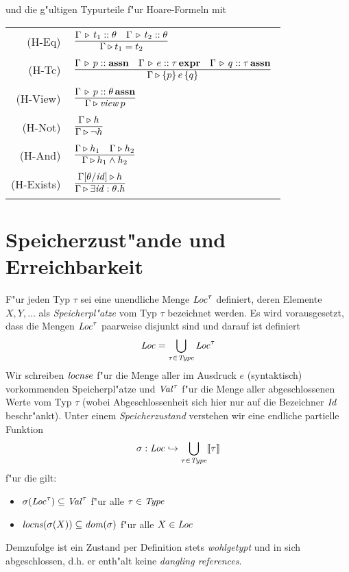 \documentclass[12pt,a4paper,bigheadings]{scrartcl}
\newcommand{\semantic}[1]{\ensuremath{\llbracket#1\rrbracket}}
\newcommand{\assn}{\ensuremath{\mathbf{assn}}}
\newcommand{\atype}[1]{#1\,\assn}
\newcommand{\bexpr}{\ensuremath{\mathbf{expr}}}
\newcommand{\etype}[1]{#1\,\bexpr}
\newcommand{\locns}{\name{locns}}
\newcommand{\view}[1]{\ensuremath{\app{\name{view}}{#1}}}
\newcommand{\RN}[1]{\mbox{{\sc (#1)}}}
\begin{document}
und die g"ultigen Typurteile f"ur Hoare-Formeln mit \\[3mm]
\begin{tabular}{rl}
  \RN{H-Eq} & $\regel{\Tj{\Gamma}{t_1}{\theta} \quad \Tj{\Gamma}{t_2}{\theta}}
                     {\Tjh{\Gamma}{t_1 = t_2}}$ \\[1mm]
  \RN{H-Tc} & $\regel{\Tj{\Gamma}{p}{\assn} \quad \Tj{\Gamma}{e}{\etype{\tau}} \quad \Tj{\Gamma}{q}{\atype{\tau}}}
                     {\Tjh{\Gamma}{\triple{p}{e}{q}}}$ \\[1mm]
  \RN{H-View} & $\regel{\Tj{\Gamma}{p}{\atype{\theta}}}
                       {\Tjh{\Gamma}{\view{p}}}$ \\[1mm]
  \RN{H-Not} & $\regel{\Tjh{\Gamma}{h}}
                      {\Tjh{\Gamma}{\neg h}}$ \\[1mm]
  \RN{H-And} & $\regel{\Tjh{\Gamma}{h_1} \quad \Tjh{\Gamma}{h_2}}
                      {\Tjh{\Gamma}{h_1 \wedge h_2}}$ \\[1mm]
  \RN{H-Exists} & $\regel{\Tjh{\Gamma[\theta/\id]}{h}}
                         {\Tjh{\Gamma}{\exists \id:\theta.h}}$
\end{tabular}


\section{Speicherzust"ande und Erreichbarkeit}

F"ur jeden Typ $\tau$ sei eine unendliche Menge ${\text{\it Loc\/}}^\tau$ definiert, deren Elemente $X,Y,\ldots$
als {\em Speicherpl"atze} vom Typ $\tau$ bezeichnet werden. Es wird vorausgesetzt, dass die Mengen
${\text{\it Loc\/}}^\tau$ paarweise disjunkt sind und darauf ist definiert
\[
  {\text{\it Loc\/}} = \bigcup_{\tau\in{\text{\it Type\/}}} {\text{\it Loc\/}}^\tau
\]
Wir schreiben $\locns{e}$ f"ur die Menge aller im Ausdruck $e$ (syntaktisch) vorkommenden Speicherpl"atze
und ${\text{\it Val\/}}^\tau$ f"ur die Menge aller abgeschlossenen Werte vom Typ $\tau$ (wobei Abgeschlossenheit sich
hier nur auf die Bezeichner ${\text{\it Id\/}}$ beschr"ankt). Unter einem {\em Speicherzustand} verstehen wir eine
endliche partielle Funktion
\[
  \sigma: \Loc \pto \bigcup_{\tau\in\Type} \semantic{\tau}
\]
f"ur die gilt:
\begin{itemize}
  \item $\sigma({\text{\it Loc\/}}^\tau) \subseteq {\text{\it Val\/}}^\tau$ f"ur alle $\tau\in{\text{\it Type\/}}$
  \item $\locns(\sigma(X)) \subseteq \dom{\sigma}$ f"ur alle $X\in{\text{\it Loc\/}}$
\end{itemize}
Demzufolge ist ein Zustand per Definition stets {\em wohlgetypt} und in sich abgeschlossen,
d.h. er enth"alt keine {\em dangling references}.
\end{document}
